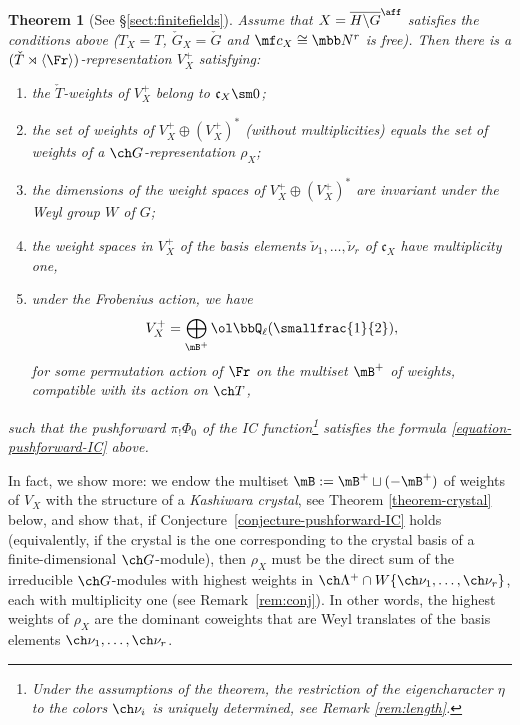 \documentclass[final]{amsart}
\newtheorem{thm}[subsubsection]{Theorem}
\theoremstyle{remark}
\theoremstyle{definition}
\numberwithin{equation}{section}
\begin{document}
\begin{thm}[See \S \ref{sect:finitefields}]
\label{theorem-affine-closure}
 Assume that $X = \overline{H\backslash G}^\aff$ satisfies the conditions above ($T_X=T$, $\check G_X=\check G$ and $\mf c_X \cong \mbb N^r$ is free). Then there is a $(\check T\rtimes\left<\Fr\right>)$-representation $V^+_X$ satisfying:
 \begin{enumerate}
  \item the $\check T$-weights of $V^+_X$ belong to $\mathfrak c_X\sm 0$;
  \item the set of weights of $V^+_X \oplus (V^+_X)^*$ (without multiplicities) equals the set of weights of a $\ch G$-representation $\rho_X$;
  \item the dimensions of the weight spaces of $V^+_X \oplus (V^+_X)^*$ are invariant under the Weyl group $W$ of $G$;
  \item the weight spaces in $V^+_X$ of the basis elements $\check\nu_1,\dots,\check\nu_r$ of $\mathfrak c_X$ have multiplicity one,
  \item under the Frobenius action, we have 
  \begin{equation}\label{e:Frobaction}
   V^+_X= \bigoplus_{\mB^+} \ol\bbQ_\ell (\smallfrac{1}{2}),
\end{equation}
 for some permutation action of $\Fr$ on the multiset $\mB^+$ of weights, compatible with its action on $\ch T$,    
\end{enumerate}
 such that the pushforward $\pi_! \Phi_0$ of the IC function\footnote{Under the assumptions of the theorem, the restriction of the eigencharacter $\eta$ to the colors $\ch\nu_i$ is uniquely determined, see Remark \ref{rem:length}.} satisfies the formula \eqref{equation-pushforward-IC} above.
\end{thm}

In fact, we show more: we endow the multiset $\mB := \mB^+ \sqcup (-\mB^+)$ of weights of $V_X$ with the structure of a \emph{Kashiwara crystal}, see Theorem \ref{theorem-crystal} below, and show that, if Conjecture~\ref{conjecture-pushforward-IC} holds (equivalently, if the crystal is the one corresponding to the crystal basis of a finite-dimensional $\ch G$-module),
then $\rho_X$ must be the direct sum of the irreducible $\ch G$-modules with highest weights 
in $\ch\Lambda^+ \cap W \{ \ch\nu_1,\dotsc,\ch\nu_r \}$, each with multiplicity one 
(see Remark~\ref{rem:conj}).
In other words, the highest weights of $\rho_X$ are the dominant coweights that are Weyl translates
of the basis elements $\ch\nu_1,\dotsc,\ch\nu_r$. 
\end{document}
